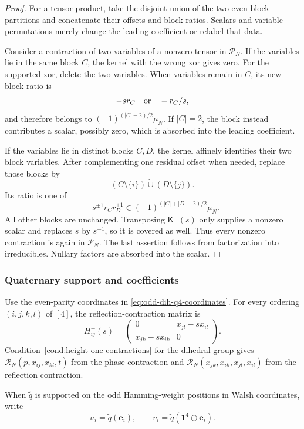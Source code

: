 \documentclass[11pt,letterpaper,onecolumn]{article}
\theoremstyle{plain}
\theoremstyle{definition}
\theoremstyle{remark}
\newcommand{\one}{\mathbf 1}
\begin{document}
	\begin{proof}
		For a tensor product, take the disjoint union of the two even-block
		partitions and concatenate their offsets and block ratios.  Scalars and variable
		permutations merely change the leading coefficient or relabel that data.
		
		Consider a contraction of two variables of a nonzero tensor in \(\mathcal P_N\).  If the
		variables lie in the same block \(C\), the kernel with the wrong xor gives zero.
		For the supported xor, delete the two variables.  When variables remain in \(C\), its
		new block ratio is
		\[
		-s r_C\quad\hbox{or}\quad-r_C/s,
		\]
		and therefore belongs to
		\((-1)^{(|C|-2)/2}\mu_N\).  If \(|C|=2\), the block instead contributes a
		scalar, possibly zero, which is absorbed into the leading coefficient.
		
		If the variables lie in distinct blocks \(C,D\), the kernel affinely identifies
		their two block variables.  After complementing one residual offset when
		needed, replace those blocks by
		\[
		(C\setminus\{i\})\mathbin{\dot\cup}(D\setminus\{j\}).
		\]
		Its ratio is one of
		\[
		-s^{\pm1}r_Cr_D^{\pm1}
		\in(-1)^{(|C|+|D|-2)/2}\mu_N.
		\]
		All other blocks are unchanged.  Transposing \(\mathsf K^-(s)\) only supplies
		a nonzero scalar and replaces \(s\) by \(s^{-1}\), so it is covered as well.
		Thus every nonzero contraction is again in \(\mathcal P_N\).
		The last assertion follows from factorization into irreducibles. Nullary factors are
		absorbed into the scalar.
	\end{proof}
	
	\subsubsection{Quaternary support and coefficients}
	\label{subsec:odd-dih-q4}
	

Use the even-parity coordinates in \cref{eq:odd-dih-q4-coordinates}.
For every ordering \((i,j,k,l)\) of \([4]\), the reflection-contraction matrix is
\[
H_{ij}^-(s)=\begin{pmatrix}0&x_{jl}-sx_{il}\\x_{jk}-sx_{ik}&0\end{pmatrix}.
\]
Condition~\ref{cond:height-one-contractions} for the dihedral group gives
\(\mathcal R_N(p,x_{ij},x_{kl},t)\) from the phase contraction and
\(\mathcal R_N(x_{jk},x_{ik},x_{jl},x_{il})\) from the reflection contraction.

	When \(\widetilde q\) is supported on the odd Hamming-weight positions in Walsh coordinates, write
	\[
	u_i=\widetilde q({\mathbf e}_i),
	\qquad v_i=\widetilde q(\one^4\oplus {\mathbf e}_i).
	\]
	
\end{document}
